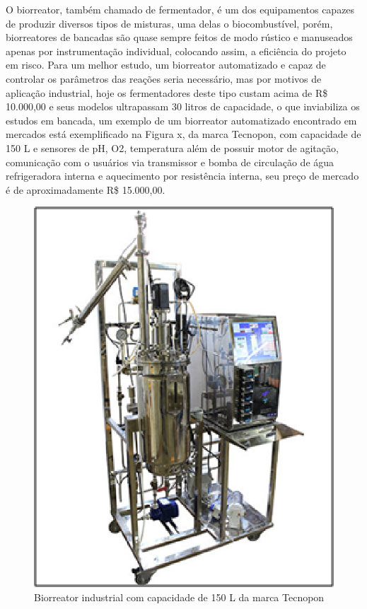 O biorreator, também chamado de fermentador, é um dos equipamentos capazes de produzir diversos tipos de misturas, uma delas o biocombustível, porém, biorreatores de bancadas são quase sempre feitos de modo rústico e manuseados apenas por instrumentação individual, colocando assim, a eficiência do projeto em risco. Para um melhor estudo, um biorreator automatizado e capaz de controlar os parâmetros das reações seria necessário, mas por motivos de aplicação industrial, hoje os fermentadores deste tipo custam acima de R\$ 10.000,00 e seus modelos ultrapassam 30 litros de capacidade, o que inviabiliza os estudos em bancada, um exemplo de um biorreator automatizado encontrado em mercados está exemplificado na Figura x, da marca Tecnopon, com capacidade de 150 L e sensores de pH, O2, temperatura além de possuir motor de agitação, comunicação com o usuários via transmissor e bomba de circulação de água refrigeradora interna e aquecimento por resistência interna, seu preço de mercado é de aproximadamente R\$ 15.000,00.

\begin{figure}[h]
	\centering
	\includegraphics[keepaspectratio=true,scale=0.8]{figuras/tecnopon.eps}
	\caption{Biorreator industrial com capacidade de 150 L da marca Tecnopon}
	\label{tecnopon}
\end{figure}


